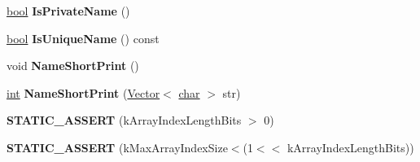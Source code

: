 \begin{DoxyCompactItemize}
\mbox{\label{classv8_1_1internal_1_1Name_a70f3ed942ba3303c3c0c242c71a83fe0}} 
\mbox{\hyperlink{classbool}{bool}} {\bfseries Is\+Private\+Name} ()
\item 
\mbox{\label{classv8_1_1internal_1_1Name_af00c78867b1e6b42cead9ef3064c81af}} 
\mbox{\hyperlink{classbool}{bool}} {\bfseries Is\+Unique\+Name} () const
\item 
\mbox{\label{classv8_1_1internal_1_1Name_a828b2e9d15bc6c6d85c5d7cd8866f8ed}} 
void {\bfseries Name\+Short\+Print} ()
\item 
\mbox{\label{classv8_1_1internal_1_1Name_a7b6690b01ac31d8246d48d11337ab404}} 
\mbox{\hyperlink{classint}{int}} {\bfseries Name\+Short\+Print} (\mbox{\hyperlink{classv8_1_1internal_1_1Vector}{Vector}}$<$ \mbox{\hyperlink{classchar}{char}} $>$ str)
\item 
\mbox{\label{classv8_1_1internal_1_1Name_a7e411588376dfd03a806abfaf3baa4eb}} 
{\bfseries S\+T\+A\+T\+I\+C\+\_\+\+A\+S\+S\+E\+RT} (k\+Array\+Index\+Length\+Bits $>$ 0)
\item 
\mbox{\label{classv8_1_1internal_1_1Name_a330d434b332223d0a31d7dfd9ca96a49}} 
{\bfseries S\+T\+A\+T\+I\+C\+\_\+\+A\+S\+S\+E\+RT} (k\+Max\+Array\+Index\+Size$<$(1$<$$<$ k\+Array\+Index\+Length\+Bits))
\end{DoxyCompactItemize}
